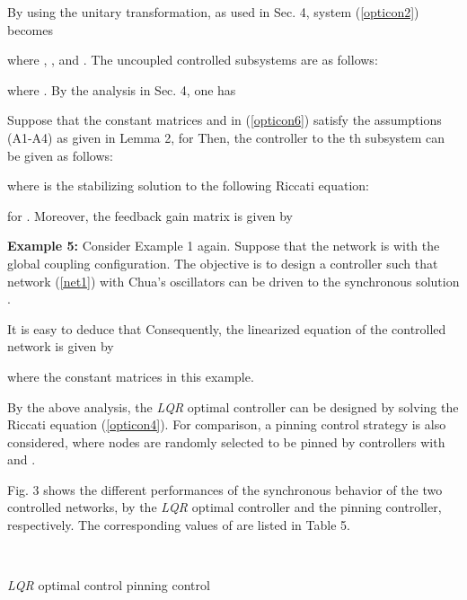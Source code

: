 \documentclass[11pt]{article}
\def\dref#1{(\ref{#1})}
\begin{document}
By using the unitary transformation, as used in Sec. 4, system
\dref{opticon2} becomes

where , ,
 and . The  uncoupled controlled subsystems
 are as follows:

where . By the analysis in Sec.
4, one has


Suppose that the constant matrices  and  in
\dref{opticon6} satisfy the assumptions (A1-A4) as given in Lemma 2,
for  Then, the controller  to the th
subsystem can be given as follows:

where  is the stabilizing solution to the following Riccati
equation:

for . Moreover, the feedback gain matrix  is
given by



\textbf{Example 5:} Consider Example 1 again. Suppose that the
network is with the global coupling configuration. The objective is
to design a controller such that network \dref{net1} with Chua's
oscillators can be driven to the synchronous solution
.

It is easy to deduce that
 Consequently, the
linearized equation of the controlled network is given by

where the constant matrices  in this example.

By the above analysis, the \textit{LQR} optimal controller can be
designed by solving the Riccati equation \dref{opticon4}. For
comparison, a pinning control strategy is also considered, where 
nodes are randomly selected to be pinned by controllers
 with  and .

Fig. 3 shows the different performances of the synchronous behavior
of the two controlled networks, by the \textit{LQR} optimal
controller and the pinning controller, respectively. The
corresponding values of  are listed in Table 5.

\begin{center}
\unitlength=1cm
 \qquad \hbox{\hspace*{0.1cm}  
 \;\quad {} 
}
\end{center}

\vskip -0.7cm\qquad\qquad\qquad\qquad\; {\small \textit{LQR} optimal
control}\qquad\qquad\qquad\qquad\qquad\qquad\; {\small pinning
control}

\qquad\qquad\qquad\qquad{}
\end{document}
